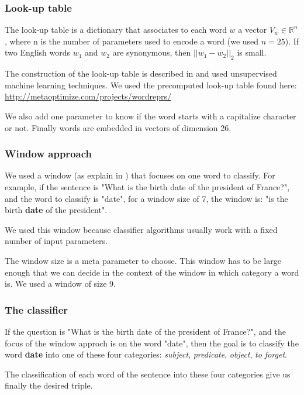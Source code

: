 \subsubsection{Look-up table}

The look-up table is a dictionary that associates to each word $w$ a vector $V_w \in \mathbb{R}^n$, where n is the number of parameters used to encode a word (we used $n=25$).
If two English words $w_1$ and $w_2$ are synonymous, then $||w_1-w_2||_2$ is small.

The construction of the look-up table is described in \cite{collobert} and used unsupervised machine learning techniques.
We used the precomputed look-up table found here: \url{http://metaoptimize.com/projects/wordreprs/}

We also add one parameter to know if the word starts with a capitalize character or not. Finally words are embedded in vectors of dimension 26. 

\subsubsection{Window approach}

We used a window (as explain in \cite{collobert}) that focuses on one word to classify. For example, if the sentence is "What is the birth date of the president of France?", and the word to classify is "date", for a window size of 7, the window is: "is the birth \textbf{date} of the president".


We used this window because classifier algorithms usually work with a fixed number of input parameters. 

The window size is a meta parameter to choose. This window has to be large enough that we can decide in the context of the window in which category a word is. We used a window of size 9.

\subsubsection{The classifier}

If the question is "What is the birth date of the president of France?", and the focus of the window approch is on the word "date", then the goal is to classify the word \textbf{date} into one of these four categories: \textit{subject}, \textit{predicate}, \textit{object}, \textit{to forget}.

The classification of each word of the sentence into these four categories give us finally the desired triple.

